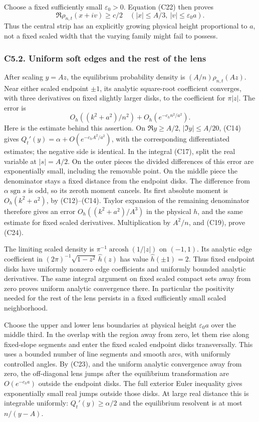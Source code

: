 Choose a fixed sufficiently small \(\varepsilon_0>0\). Equation (C22)
then proves \[
\Re\rho_{n,t}(x+iv)\ge c/2
\quad(|x|\le A/3,\ |v|\le\varepsilon_0a).\tag{C23}
\] Thus the central strip has an explicitly growing physical height
proportional to \(a\), not a fixed scaled width that the varying family
might fail to possess.

\subsubsection{C5.2. Uniform soft edges and the rest of the
lens}\label{sa:c5.2.-uniform-soft-edges-and-the-rest-of-the-lens}

After scaling \(y=Az\), the equilibrium probability density is
\((A/n)\rho_{n,t}(Az)\). Near either scaled endpoint \(\pm1\), its
analytic square-root coefficient converges, with three derivatives on
fixed slightly larger disks, to the coefficient for \(\pi|z|\). The
error is \[
O_h((k^2+a^2)/n^2)+O_h(e^{-c_hn^2/a^2}).\tag{C24}
\] Here is the estimate behind this assertion. On \(\Re y\ge A/2\),
\(|\Im y|\le A/20\), (C14) gives \(Q_t'(y)=\alpha+O(e^{-c_h A^2/a^2})\),
with the corresponding differentiated estimates; the negative side is
identical. In the integral (C17), split the real variable at
\(|s|=A/2\). On the outer pieces the divided differences of this error
are exponentially small, including the removable point. On the middle
piece the denominator stays a fixed distance from the endpoint disks.
The difference from \(\alpha\operatorname{sgn}s\) is odd, so its zeroth
moment cancels. Its first absolute moment is \(O_h(k^2+a^2)\), by
(C12)--(C14). Taylor expansion of the remaining denominator therefore
gives an error \(O_h((k^2+a^2)/A^3)\) in the physical \(h\), and the
same estimate for fixed scaled derivatives. Multiplication by \(A^2/n\),
and (C19), prove (C24).

The limiting scaled density is \(\pi^{-1}\operatorname{arcosh}(1/|z|)\)
on \((-1,1)\). Its analytic edge coefficient in
\((2\pi)^{-1}\sqrt{1-z^2}\,\widehat h(z)\) has value
\(\widehat h(\pm1)=2\). Thus fixed endpoint disks have uniformly nonzero
edge coefficients and uniformly bounded analytic derivatives. The same
integral argument on fixed scaled compact sets away from zero proves
uniform analytic convergence there. In particular the positivity needed
for the rest of the lens persists in a fixed sufficiently small scaled
neighborhood.

Choose the upper and lower lens boundaries at physical height
\(\varepsilon_0a\) over the middle third. In the overlap with the region
away from zero, let them rise along fixed-slope segments and enter the
fixed scaled endpoint disks transversally. This uses a bounded number of
line segments and smooth arcs, with uniformly controlled angles. By
(C23), and the uniform analytic convergence away from zero, the
off-diagonal lens jumps after the equilibrium transformation are
\(O(e^{-c_ha})\) outside the endpoint disks. The full exterior Euler
inequality gives exponentially small real jumps outside those disks. At
large real distance this is integrable uniformly: \(Q_t'(y)\ge\alpha/2\)
and the equilibrium resolvent is at most \(n/(y-A)\).

